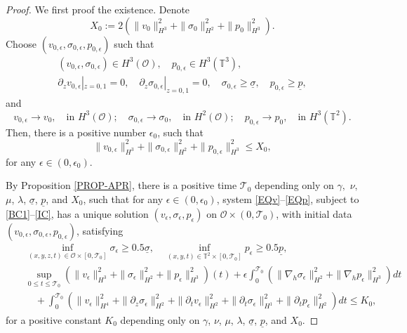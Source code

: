 \documentclass[12pt,reqno]{amsart}
\numberwithin{equation}{section}
\begin{document}
\begin{proof}
We first proof the existence.
Denote
$$
X_0:=2(\|v_{0}\|_{H^3}^2+\|\sigma_{0}\|_{H^2}^2+\|p_0\|_{H^3}^2).
$$
Choose $(v_{0,\epsilon}, \sigma_{0,\epsilon}, p_{0,\epsilon})$ such that
\begin{eqnarray*}
  (v_{0,\epsilon}, \sigma_{0,\epsilon})\in H^3(\mathcal O),\quad p_{0,\epsilon}\in H^3(\mathbb T^3),\\ \partial_zv_{0,\epsilon}|_{z=0,1}=0,\quad \partial_z\sigma_{0,\epsilon}|_{z=0,1}=0,\quad
  \sigma_{0,\epsilon}\geq\underline\sigma, \quad p_{0,\epsilon}\geq\underline p,
\end{eqnarray*}
and
$$
  v_{0,\epsilon}\rightarrow v_0,\quad\mbox{in }H^3(\mathcal O);\quad
  \sigma_{0,\epsilon}\rightarrow\sigma_0,\quad\mbox{in }H^2(\mathcal O);\quad
  p_{0,\epsilon}\rightarrow p_0,\quad\mbox{in }H^3(\mathbb T^2).
$$
Then, there is a positive number $\epsilon_0$, such that
$$
\|v_{0,\epsilon}\|_{H^3}^2+\|\sigma_{0,\epsilon}\|_{H^2}^2+\|p_{0,\epsilon}\|_{H^3}^2\leq X_0,
$$
for any $\epsilon\in(0,\epsilon_0)$.

By Proposition \ref{PROP-APR}, there is a positive time $\mathcal T_0$ depending only on $\gamma,$ $\nu,$ $\mu$, $\lambda$,
$\underline\sigma$, $\underline p$, and $X_0$, such that for any $\epsilon\in(0,\epsilon_0)$, system \eqref{EQv}--\eqref{EQp}, subject to \eqref{BC1}--\eqref{IC}, has a unique solution $(v_\epsilon,
\sigma_\epsilon, p_\epsilon)$ on $\mathcal O\times(0,\mathcal T_0)$,
with initial data $(v_{0,\epsilon}, \sigma_{0,\epsilon}, p_{0,\epsilon})$, satisfying
 \begin{eqnarray}
  &&\inf_{(x,y,z,t)\in\mathcal O\times[0,\mathcal T_0]}\sigma_\epsilon\geq0.5\underline\sigma,\quad \inf_{(x,y,t)\in\mathbb T^2\times[0,\mathcal T_0]}p_\epsilon\geq0.5\underline p,\label{APRLBsp}\\
  &&\sup_{0\leq t\leq\mathcal T_0}(\|v_\epsilon\|_{H^3}^2+\|\sigma_\epsilon\|_{H^2}^2+\|p_\epsilon\|_{H^3}^2)(t)
  +\epsilon\int_0^{\mathcal T_0}(\|\nabla_h\sigma_\epsilon\|_{H^2}^2+\|\nabla_hp_\epsilon\|_{H^3}^2)dt\nonumber\\
  &&\, \, ~~~+\int_0^{\mathcal T_0}(\|v_\epsilon\|_{H^4}^2+\|\partial_z\sigma_\epsilon\|_{H^2}^2+\|\partial_tv_\epsilon\|_{H^2}^2+\|\partial_t\sigma_\epsilon
  \|_{H^1}^2+\|\partial_tp_\epsilon\|_{H^2}^2)dt \leq K_0,\label{APRHk}
  \end{eqnarray}
  for a positive constant $K_0$ depending only on $\gamma$, $\nu$, $\mu$, $\lambda$, $\underline\sigma$, $\underline p$, and
  $X_0$.


\end{proof}
\end{document}
